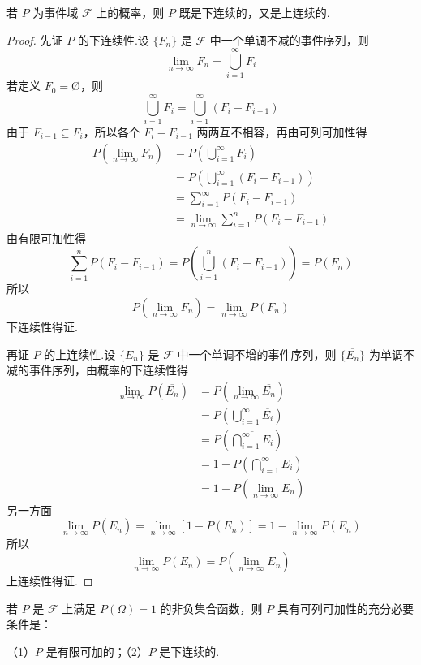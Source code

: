 \begin{property}
    \indent 若 $P$ 为事件域 $\mathcal{F}$ 上的概率，则 $P$ 既是下连续的，又是上连续的.
\end{property}

\begin{proof}
    先证 $P$ 的下连续性.设 $\{ F_n \}$ 是 $\mathcal{F}$ 中一个单调不减的事件序列，则
    $$
    \lim_{n \to \infty} F_n = \bigcup_{i=1}^{\infty} F_i
    $$
    若定义 $F_0 = \text{\O}$，则
    $$
    \bigcup_{i=1}^{\infty} F_i = \bigcup_{i=1}^{\infty} (F_i - F_{i-1})
    $$
    由于 $F_{i-1} \subseteq F_i$，所以各个 $F_i - F_{i-1}$ 两两互不相容，再由可列可加性得
    $$
    \begin{aligned}
        P(\lim_{n \to \infty} F_n) &= P \left( \bigcup_{i=1}^{\infty} F_i \right) \\
        &= P \left( \bigcup_{i=1}^{\infty} (F_i - F_{i-1}) \right) \\
        &= \sum_{i=1}^{\infty} P(F_i - F_{i-1}) \\
        &= \lim_{n \to \infty} \sum_{i=1}^n P(F_i - F_{i-1})
    \end{aligned}
    $$
    由有限可加性得
    $$
    \sum_{i=1}^n P(F_i - F_{i-1}) = P \left( \bigcup_{i=1}^n (F_i - F_{i-1}) \right) = P(F_n)
    $$
    所以
    $$
    P(\lim_{n \to \infty} F_n) = \lim_{n \to \infty} P(F_n)
    $$
    下连续性得证.

    再证 $P$ 的上连续性.设 $\{ E_n \}$ 是 $\mathcal{F}$ 中一个单调不增的事件序列，则 $\{ \overline{E_n} \}$ 为单调不减的事件序列，由概率的下连续性得
    $$
    \begin{aligned}
        \lim_{n \to \infty} P(\overline{E_n}) &= P(\lim_{n \to \infty} \overline{E_n}) \\
        &= P \left( \bigcup_{i=1}^{\infty} \overline{E_i} \right) \\
        &= P \left(\overline{\bigcap_{i=1}^{\infty} E_i} \right) \\
        &= 1 - P \left(\bigcap_{i=1}^{\infty} E_i \right) \\
        &= 1 - P(\lim_{n \to \infty} E_n)
    \end{aligned}
    $$
    另一方面
    $$
    \lim_{n \to \infty} P(\overline{E_n}) = \lim_{n \to \infty} [1 - P(E_n)] = 1 - \lim_{n \to \infty} P(E_n)
    $$
    所以
    $$
    \lim_{n \to \infty} P(E_n) = P(\lim_{n \to \infty} E_n)
    $$
    上连续性得证.
\end{proof}

\begin{theorem}[][][theorem:可列可加性=有限可加性+下连续性]
    \indent 若 $P$ 是 $\mathcal{F}$ 上满足 $P(\varOmega) = 1$ 的非负集合函数，则 $P$ 具有可列可加性的充分必要条件是：

    （1）$P$ 是有限可加的；（2）$P$ 是下连续的.
\end{theorem}

